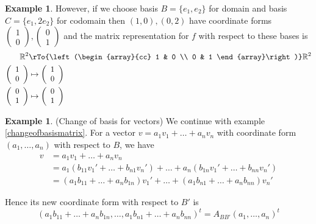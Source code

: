 \documentclass[12pt]{amsart}
\theoremstyle{definition}
\newtheorem{example}[theorem]{Example}
\begin{document}
\begin{example}
However, if we choose basis $B = \{e_1, e_2\}$ for domain and basis $C = \{e_1, 2e_2\}$ for codomain then $(1,0), (0,2)$ have coordinate forms $\left( \begin{array}{c} 1 \\ 0 \end{array}\right), \left( \begin{array}{c} 0 \\ 1 \end{array}\right)$ and the matrix representation for $f$ with respect to these bases is
\begin{align*}
\mathbb{R}^2 & \rTo{\left(\begin{array}{cc} 1 & 0 \\ 0 & 1 \end{array}\right)} \mathbb{R}^2 \\
\left( \begin{array}{c} 1 \\ 0 \end{array}\right) & \mapsto \left( \begin{array}{c} 1 \\ 0 \end{array}\right) \\
\left( \begin{array}{c} 0 \\ 1 \end{array}\right) & \mapsto \left( \begin{array}{c} 0 \\ 1 \end{array}\right)
\end{align*}
\end{example}

\begin{example}\label{changeofbasisforvectors} (Change of basis for vectors) We continue with example \ref{changeofbasismatrix}. For a vector $v = a_1v_1 + \ldots + a_nv_n$ with coordinate form $(a_1, \dots, a_n)$ with respect to $B$, we have
\begin{align*}
v & = a_1v_1 + \ldots + a_n v_n \\
 & = a_1(b_{11}v_1' + \ldots + b_{n1}v_n') + \ldots + a_n(b_{1n}v_1' + \ldots + b_{nn}v_n') \\
 & = (a_1b_{11} + \ldots + a_n b_{1n})v_1' + \ldots + (a_1 b_{n1} + \ldots + a_n b_{nn})v_n'
\end{align*}

Hence its new coordinate form with respect to $B'$ is
$$(a_1 b_{11} + \ldots + a_n b_{1n}, \dots, a_1b_{n1} + \ldots + a_n b_{nn})^t = A_{BB'}(a_1, \dots, a_n)^t$$
\end{example}
\end{document}
